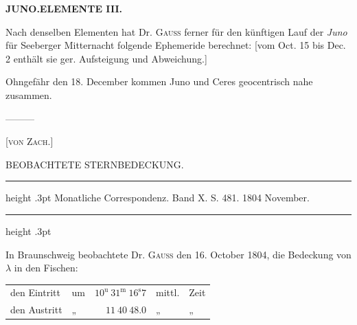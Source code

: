 \clearpage
\thispagestyle{empty}
\noindent{}%
%
\parbox[t]{\dimexpr\linewidth-24mm\relax}{\centering\footnotesize\bfseries JUNO.\enspace ELEMENTE III.\par}%
\makebox[12mm][r]{}\par\nobreak\medskip
\par\indent Nach denselben Elementen hat Dr. \textsc{Gauss} ferner für den künftigen Lauf der \emph{Juno} für Seeberger
Mitternacht folgende Ephemeride berechnet: [vom Oct. 15 bis Dec. 2 enthält sie ger. Aufsteigung und
Abweichung.]

\par\indent Ohngefähr den 18. December kommen Juno und Ceres geocentrisch nahe zusammen.

\par\indent —\quad—\quad—\par

\hfill[\textsc{von Zach.}]

\par\bigskip
{}
\begin{center}
\large BEOBACHTETE STERNBEDECKUNG.
\end{center}

\begin{center}
\parbox{.72\linewidth}{%
\centering\fontsize{8.2}{10.2}\selectfont
\hrule height .3pt\relax\vspace{2.5pt}
Monatliche Correspondenz. Band X. S. 481. 1804 November.\par
\vspace{2.5pt}\hrule height .3pt\relax
}
\end{center}

\begin{samepage}
\par\indent In Braunschweig beobachtete Dr. \textsc{Gauss} den 16. October 1804, die Bedeckung von $\lambda$ in den Fischen:

\begin{center}
\begingroup\fontsize{10}{12}\selectfont\setlength{\tabcolsep}{3pt}\renewcommand{\arraystretch}{1.1}
\begin{tabular}{llrll}
den Eintritt & um & $10^{\mathrm u}\ 31^{\mathrm m}\ 16^{\mathrm s}7$ & mittl. & Zeit \\
den Austritt & „ & $11\ 40\ 48.0$ & „ & „ \\
\end{tabular}\endgroup
\end{center}
\end{samepage}
